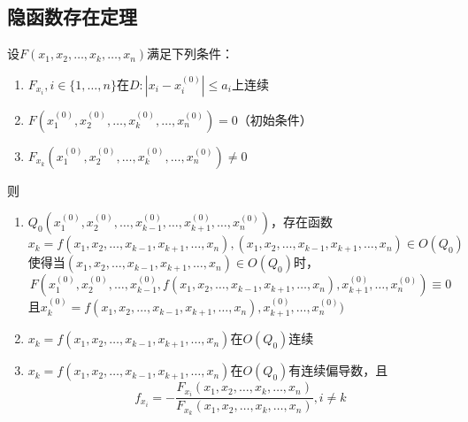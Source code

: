 \subsection{隐函数存在定理}
\begin{theorem}
设$F(x_1,x_2,\ldots,x_k,\ldots,x_n)$满足下列条件：
\begin{enumerate}
	\item $F_{x_i},i\in\{1,\ldots,n\}$在$D:|x_i-x_i^{(0)}|\leq a_i$上连续
	\item $F(x_1^{(0)},x_2^{(0)},\ldots,x_k^{(0)},\ldots,x_n^{(0)})=0$（初始条件）
	\item $F_{x_k}(x_1^{(0)},x_2^{(0)},\ldots,x_k^{(0)},\ldots,x_n^{(0)})\ne0$
\end{enumerate}
则
\begin{enumerate}
	\item $Q_0(x_1^{(0)},x_2^{(0)},\ldots,x_{k-1}^{(0)},\ldots,x_{k+1}^{(0)},\ldots,x_n^{(0)})$，存在函数\[x_k=f(x_1,x_2,\ldots,x_{k-1},x_{k+1},\ldots,x_n),(x_1,x_2,\ldots,x_{k-1},x_{k+1},\ldots,x_n)\in O(Q_0)\]
	使得当$(x_1,x_2,\ldots,x_{k-1},x_{k+1},\ldots,x_n)\in O(Q_0)$时，
	\[F(x_1^{(0)},x_2^{(0)},\ldots,x_{k-1}^{(0)},f(x_1,x_2,\ldots,x_{k-1},x_{k+1},\ldots,x_n),x_{k+1}^{(0)},\ldots,x_n^{(0)})\equiv 0\]
	且$x_{k}^{(0)}=f(x_1,x_2,\ldots,x_{k-1},x_{k+1},\ldots,x_n),x_{k+1}^{(0)},\ldots,x_n^{(0)})$
	\item $x_k=f(x_1,x_2,\ldots,x_{k-1},x_{k+1},\ldots,x_n)$在$O(Q_0)$连续
	\item $x_k=f(x_1,x_2,\ldots,x_{k-1},x_{k+1},\ldots,x_n)$在$O(Q_0)$有连续偏导数，且
	\[f_{x_i}=-\frac{F_{x_i}(x_1,x_2,\ldots,x_k,\ldots,x_n)}{F_{x_k}(x_1,x_2,\ldots,x_k,\ldots,x_n)},i\ne k\]
\end{enumerate}
\end{theorem}
